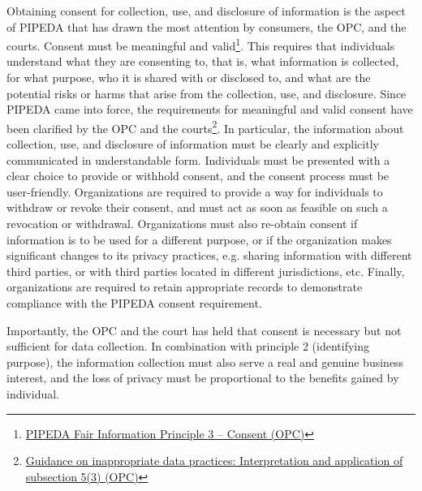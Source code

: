 Obtaining consent for collection, use, and disclosure of information is the aspect of PIPEDA that has drawn the most attention by consumers, the OPC, and the courts. Consent must be meaningful and valid\footnote{\href{https://www.priv.gc.ca/en/privacy-topics/privacy-laws-in-canada/the-personal-information-protection-and-electronic-documents-act-pipeda/p_principle/principles/p_consent/}{PIPEDA Fair Information Principle 3 -- Consent (OPC)}}. This requires that individuals understand what they are consenting to, that is, what information is collected, for what purpose, who it is shared with or disclosed to, and what are the potential risks or harms that arise from the collection, use, and disclosure. Since PIPEDA came into force, the requirements for meaningful and valid consent have been clarified by the OPC and the courts\footnote{\href{https://www.priv.gc.ca/en/privacy-topics/collecting-personal-information/consent/gd_53_201805/}{Guidance on inappropriate data practices: Interpretation and application of subsection 5(3) (OPC)}}. In particular, the information about collection, use, and disclosure of information must be clearly and explicitly communicated in understandable form. Individuals must be presented with a clear choice to provide or withhold consent, and the consent process must be user-friendly. Organizations are required to provide a way for individuals to withdraw or revoke their consent, and must act as soon as feasible on such a revocation or withdrawal. Organizations must also re-obtain consent if information is to be used for a different purpose, or if the organization makes significant changes to its privacy practices, e.g. sharing information with different third parties, or with third parties located in different jurisdictions, etc. Finally, organizations are required to retain appropriate records to demonstrate compliance with the PIPEDA consent requirement. 

Importantly, the OPC and the court has held that consent is necessary but not sufficient for data collection. In combination with principle 2 (identifying purpose), the information collection must also serve a real and genuine business interest, and the loss of privacy must be proportional to the benefits gained by individual. 

